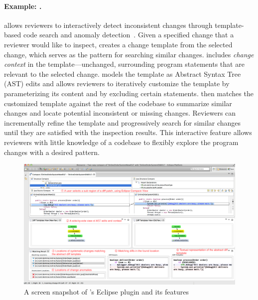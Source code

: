 

\paragraph{Example: {\critics}.} {\critics} allows reviewers to interactively detect inconsistent changes through template-based code search and anomaly detection~\cite{zhang2015interactive}. Given a specified change that a reviewer would like to inspect, {\critics} creates a change template from the selected change, which serves as the pattern for searching similar changes. {\critics} includes {\em change context} in the template---unchanged, surrounding program statements that are relevant to the selected change. {\critics} models the template as Abstract Syntax Tree (AST) edits and allows reviewers to iteratively customize the template by parameterizing its content and by excluding certain statements. {\critics} then matches the customized template against the rest of the codebase to summarize similar changes and locate potential inconsistent or missing changes. Reviewers can incrementally refine the template and progressively search for similar changes until they are satisfied with the inspection results. This interactive feature allows reviewers with little knowledge of a codebase to flexibly explore the program changes with a desired pattern. %

\begin{figure}[ht]
 \centering
 \includegraphics[width=\textwidth]{images/critics-UI.pdf}
 \caption{A screen snapshot of {\critics}'s Eclipse plugin and its features}
 \label{fig:critics-UI}
\end{figure}

